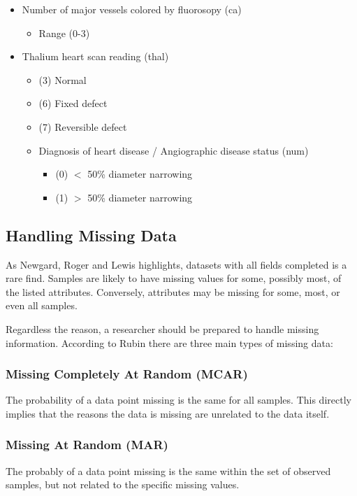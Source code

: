 \documentclass[conference]{IEEEtran}
\begin{document}
\begin{itemize}
\begin{itemize}
    \end{itemize}
    \item Number of major vessels colored by fluorosopy (ca)
    \begin{itemize}
        \item Range (0-3)
    \end{itemize}
    \item Thalium heart scan reading (thal)
    \begin{itemize}
        \item (3) Normal 
        \item (6) Fixed defect
        \item (7) Reversible defect
    \end{itemize}
    \begin{itemize}
        \item Diagnosis of heart disease / Angiographic disease status  (num)
        \begin{itemize}
            \item (0) $<$ 50\% diameter narrowing 
            \item (1) $>$ 50\% diameter narrowing 
        \end{itemize}
    \end{itemize}
\end{itemize}

\subsection{Handling Missing Data}
As Newgard, Roger and Lewis highlights, datasets with all fields completed is a rare find\cite{b9}. Samples are likely to have missing values for some, possibly most, of the listed attributes. Conversely, attributes may be missing for some, most, or even all samples. 

Regardless the reason, a researcher should be prepared to handle missing information. According to Rubin there are three main types of missing data\cite{b10}: 

\subsubsection{Missing Completely At Random (MCAR)}
The probability of a data point missing is the same for all samples. This directly implies that the reasons the data is missing are unrelated to the data itself\cite{b11}.

\subsubsection{Missing At Random (MAR)}
The probably of a data point missing is the same within the set of observed samples, but not related to the specific missing values. 
\end{document}
